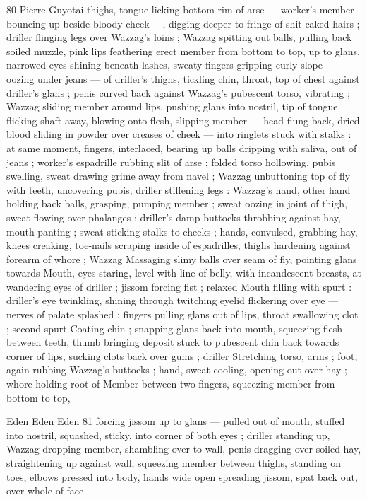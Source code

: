 80 Pierre Guyotai
thighs, tongue licking bottom rim of arse — worker's member
bouncing up beside bloody cheek —, digging deeper to fringe of
shit-caked hairs ; driller flinging legs over Wazzag's loins ; Wazzag
spitting out balls, pulling back soiled muzzle, pink lips feathering
erect member from bottom to top, up to glans, narrowed eyes shining
beneath lashes, sweaty fingers gripping curly slope — oozing under
jeans — of driller's thighs, tickling chin, throat, top of chest against
driller's glans ; penis curved back against Wazzag's pubescent torso,
vibrating ; Wazzag sliding member around lips, pushing glans into
nostril, tip of tongue flicking shaft away, blowing onto flesh, slipping
member — head flung back, dried blood sliding in powder over
creases of cheek — into ringlets stuck with stalks : at same moment,
fingers, interlaced, bearing up balls dripping with saliva, out of jeans
; worker's espadrille rubbing slit of arse ; folded torso hollowing,
pubis swelling, sweat drawing grime away from navel ; Wazzag
unbuttoning top of fly with teeth, uncovering pubis, driller stiffening
legs : Wazzag's hand, other hand holding back balls, grasping,
pumping member ; sweat oozing in joint of thigh, sweat flowing over
phalanges ; driller's damp buttocks throbbing against hay, mouth
panting ; sweat sticking stalks to cheeks ; hands, convulsed,
grabbing hay, knees creaking, toe-nails scraping inside of
espadrilles, thighs hardening against forearm of whore ; Wazzag
Massaging slimy balls over seam of fly, pointing glans towards
Mouth, eyes staring, level with line of belly, with incandescent
breasts, at wandering eyes of driller ; jissom forcing fist ; relaxed
Mouth filling with spurt : driller's eye twinkling, shining through
twitching eyelid flickering over eye — nerves of palate splashed ;
fingers pulling glans out of lips, throat swallowing clot ; second spurt
Coating chin ; snapping glans back into mouth, squeezing flesh
between teeth, thumb bringing deposit stuck to pubescent chin back
towards corner of lips, sucking clots back over gums ; driller
Stretching torso, arms ; foot, again rubbing Wazzag's buttocks ;
hand, sweat cooling, opening out over hay ; whore holding root of
Member between two fingers, squeezing member from bottom to top,

Eden Eden Eden 81
forcing jissom up to glans — pulled out of mouth, stuffed into
nostril, squashed, sticky, into corner of both eyes ; driller standing
up, Wazzag dropping member, shambling over to wall, penis dragging
over soiled hay, straightening up against wall, squeezing member
between thighs, standing on toes, elbows pressed into body, hands
wide open spreading jissom, spat back out, over whole of face

